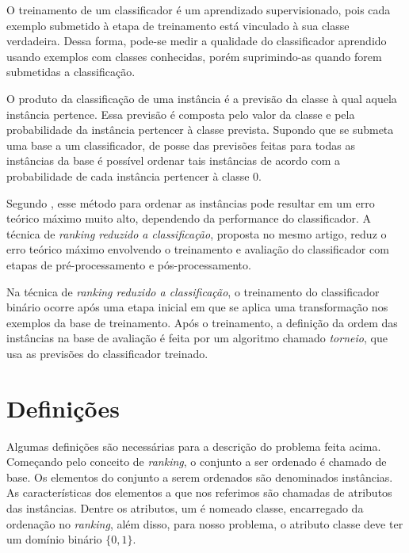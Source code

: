 O treinamento de um classificador é um aprendizado supervisionado, pois cada exemplo submetido à etapa de treinamento está vinculado à sua classe verdadeira. Dessa forma, pode-se medir a qualidade do classificador aprendido usando exemplos com classes conhecidas, porém suprimindo-as quando forem submetidas a classificação.

O produto da classificação de uma instância é a previsão da classe à qual aquela instância pertence. Essa previsão é composta pelo valor da classe e pela probabilidade da instância pertencer à classe prevista. Supondo que se submeta uma base a um classificador, de posse das previsões feitas para todas as instâncias da base é possível ordenar tais instâncias de acordo com a probabilidade de cada instância pertencer à classe $0$.

Segundo \cite{langford08}, esse método para ordenar as instâncias pode resultar em um erro teórico máximo muito alto, dependendo da performance do classificador. A técnica de \emph{ranking reduzido a classificação}, proposta no mesmo artigo, reduz o erro teórico máximo envolvendo o treinamento e avaliação do classificador com etapas de pré-processamento e pós-processamento.

Na técnica de \emph{ranking reduzido a classificação}, o treinamento do classificador binário ocorre após uma etapa inicial em que se aplica uma transformação nos exemplos da base de treinamento. Após o treinamento, a definição da ordem das instâncias na base de avaliação é feita por um algoritmo chamado \emph{torneio}, que usa as previsões do classificador treinado.

\section{Definições}

Algumas definições são necessárias para a descrição do problema feita acima. Começando pelo conceito de \emph{ranking}, o conjunto a ser ordenado é chamado de base. Os elementos do conjunto a serem ordenados são denominados instâncias. As características dos elementos a que nos referimos são chamadas de atributos das instâncias. Dentre os atributos, um é nomeado classe, encarregado da ordenação no \emph{ranking}, além disso, para nosso problema, o atributo classe deve ter um domínio binário $\{0, 1\}$.

